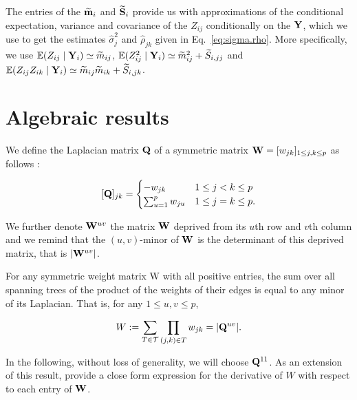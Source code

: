 The entries of the $\widetilde{\bf m}_i$ and $\widetilde{\bf S}_i$ provide us with approximations of the conditional expectation,  variance and covariance of the $Z_{ij}$ conditionally on the ${\bf Y}$, which we use to get the estimates $\widehat{\sigma}_j^2$ and $\widehat{\rho}_{jk}$ given in Eq.~\eqref{eq:sigma.rho}. More specifically, we use $\operatorname*{\mathbb{E}}(Z_{ij} \mid {\bf Y}_i) \simeq \widetilde{m}_{ij}$, $\operatorname*{\mathbb{E}}(Z^2_{ij} \mid {\bf Y}_i) \simeq \widetilde{m}_{ij}^2 + \widetilde{S}_{i,jj}$ and $\operatorname*{\mathbb{E}}(Z_{ij} Z_{ik} \mid {\bf Y}_i) \simeq \widetilde{m}_{ij} \widetilde{m}_{ik} + \widetilde{S}_{i, jk}$.


\section{Algebraic results}
 We define the Laplacian matrix ${\bf Q}$ of a symmetric matrix ${\bf W}=[w_{jk} ]_{1\leq j,k\leq p}$ as follows :
 
\[
 [{\bf Q}]_{jk}  =\begin{cases}
    -w_{jk}  & 1\leq j<k \leq p\\
    \sum_{u=1}^p w_{ju} & 1\leq j=k \leq p.
    \end{cases}
\]
 
We further denote ${\bf W}^{uv}$ the matrix ${\bf W}$ deprived from its $u$th row and $v$th column and we remind that the $(u, v)$-minor of ${\bf W}$ is the determinant of this deprived matrix, that is $|{\bf W}^{uv}|$.

\begin{theorem} \label{thm:MTT}
    For any symmetric weight matrix W with all positive entries, the sum over all spanning trees of the product of the weights of their edges is equal to any minor of its Laplacian. That is, for any $1 \leq u, v \leq p$,
 
   \[
    W := \sum_{T\in\mathcal{T}} \prod_{(j, k)\in T} w_{jk} = |{\bf Q}^{uv}|.
    \]
   
\end{theorem}    

In the following, without loss of generality, we will choose ${\bf Q}^{11}$. As an extension of this result, \cite{MeilaJaak} provide a close form expression for the derivative of $W$ with respect to each entry of ${\bf W}$. 

